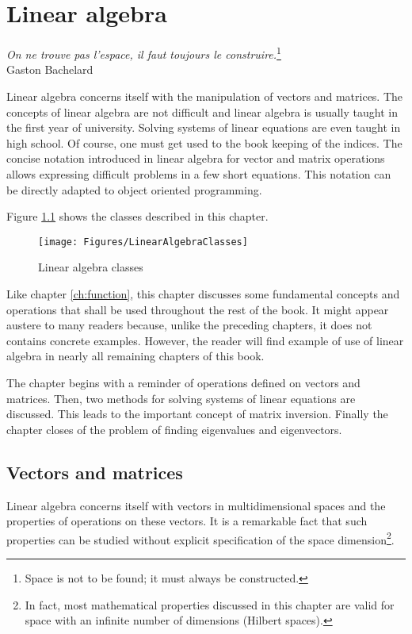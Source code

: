 \documentclass[twoside]{book}
\begin{document}
\fi

\chapter{Linear algebra}
\label{ch:linearalgebra}
\begin{flushright}
{\sl On ne trouve pas l'espace, il faut toujours le
construire.}\footnote{Space is not to be found; it must always be
constructed.}\\ Gaston Bachelard
\end{flushright}
\vspace{1 ex} Linear algebra concerns itself with the manipulation
of vectors and matrices. The concepts of linear algebra are not
difficult and linear algebra is usually taught in the first year
of university. Solving systems of linear equations are even taught
in high school. Of course, one must get used to the book keeping
of the indices. The concise notation introduced in linear algebra
for vector and matrix operations allows expressing difficult
problems in a few short equations. This notation can be directly
adapted to object oriented programming.

Figure \ref{fig:linearalgebraclasses} shows the classes described
in this chapter.
\begin{figure}
\centering\texttt{[image: Figures/LinearAlgebraClasses]}
\caption{Linear algebra classes}\label{fig:linearalgebraclasses}
\end{figure}
Like chapter \ref{ch:function}, this chapter discusses some
fundamental concepts and operations that shall be used throughout
the rest of the book. It might appear austere to many readers
because, unlike the preceding chapters, it does not contains
concrete examples. However, the reader will find example of use of
linear algebra in nearly all remaining chapters of this book.

The chapter begins with a reminder of operations defined on
vectors and matrices. Then, two methods for solving systems of
linear equations are discussed. This leads to the important
concept of matrix inversion. Finally the chapter closes of the
problem of finding eigenvalues and eigenvectors.

\section{Vectors and matrices}
\label{sec:linearalgebra} Linear algebra concerns itself with
vectors in multidimensional spaces and the properties of
operations on these vectors. It is a remarkable fact that such
properties can be studied without explicit specification of the
space dimension\footnote{In fact, most mathematical properties
discussed in this chapter are valid for space with an infinite
number of dimensions (Hilbert spaces).}.
\end{document}
